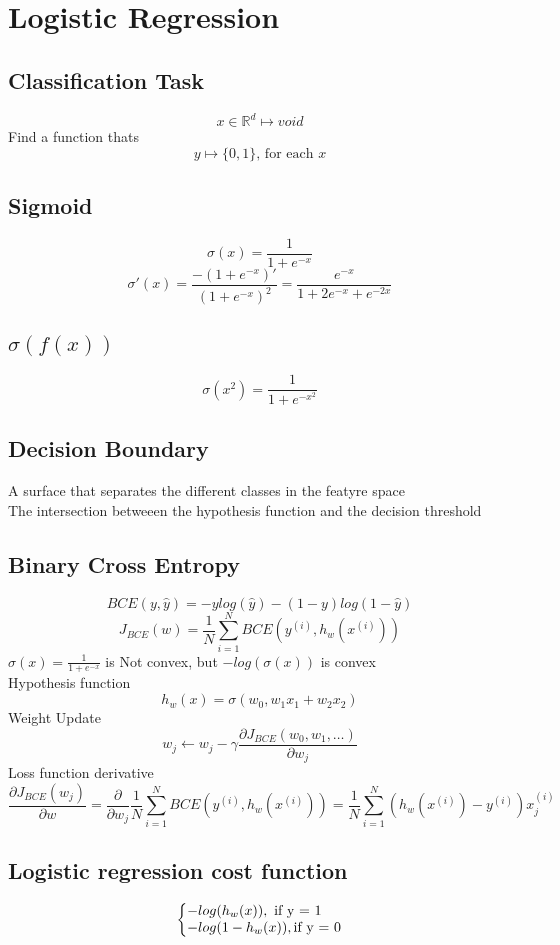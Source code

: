 \documentclass{article}
\makeatletter
\newenvironment{system}%
{\left\lbrace\begin{array}{@{}l@{}}}%
{\end{array}\right.}
\makeatother
\begin{document}
\section{Logistic Regression}
\subsection*{Classification Task}
\[x \in \mathbb{R}^d \mapsto void\]
Find a function thats 
\[y \mapsto \{0, 1\} \text{, for each } x\]
\subsection*{Sigmoid}
\[\sigma(x) = \frac{1}{1 + e^{-x}}\]
\[\sigma'(x) = \frac{-(1 + e^{-x})'}{(1 + e^{-x})^2} = \frac{e^{-x}}{1 + 2e^{-x} + e^{-2x}}\]

\subsection*{$\sigma(f(x))$}
\[\sigma(x^2) = \frac{1}{1 + e^{-x^2}}\]

\subsection*{Decision Boundary}
A surface that separates the different classes in the featyre space \\
The intersection betweeen the hypothesis function and the decision threshold \\

\subsection*{Binary Cross Entropy}
\[BCE(y, \hat{y}) = -ylog(\hat{y}) - (1 - y)log(1 - \hat{y})\]
\[J_{BCE}(w) = \frac{1}{N} \sum_{i=1}^{N} BCE(y^{(i)}, h_w(x^{(i)}))\]
$\sigma(x) = \frac{1}{1 + e^{-x}}$ is Not convex, but
$-log(\sigma(x))$ is convex\\
Hypothesis function
\[h_w(x) = \sigma(w_0, w_1 x_1 + w_2 x_2) \]
Weight Update
\[w_j \leftarrow w_j - \gamma \frac{\partial J_{BCE}(w_0, w_1, \dots)}{\partial w_j}\]
Loss function derivative
\[\frac{\partial J_{BCE}(w_j)}{\partial w} = \frac{\partial}{\partial w_j} \frac{1}{N} \sum_{i=1}^{N} BCE(y^{(i)}, h_w(x^{(i)})) = \frac{1}{N} \sum_{i=1}^{N} (h_w(x^{(i)}) - y^{(i)})x_j^{(i)}\]
\subsection{Logistic regression cost function}
\begin{equation}
    \begin{system}
    -log(h_w(x)), \text{ if y = 1}\\
    -log(1 - h_w(x)), \text{if y = 0}
    \end{system}
\end{equation}
\end{document}
